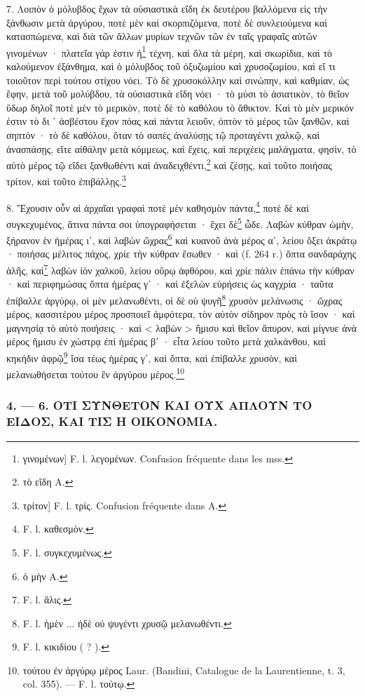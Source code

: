 \documentclass[a4paper, 11pt, oneside, polutonikogreek, french]{article}
\begin{document}
7. Λοιπὸν ὁ μόλυβδος ἔχων τὰ οὐσιαστικὰ εἴδη ἐκ δευτέρου βαλλόμενα εἰς τὴν ξάνθωσιν μετὰ ἀργύρου, ποτὲ μὲν καὶ σκορπιζόμενα, ποτὲ δὲ συνλειούμενα καὶ κατασπώμενα, καὶ διὰ τῶν ἄλλων μυρίων τεχνῶν τῶν ἐν ταῖς γραφαῖς αὐτῶν γινομένων · πλατεῖα γάρ ἐστιν ἡ\footnote{γινομένων] F. l. λεγομένων. Confusion fréquente dans les mss.} τέχνη, καὶ ὅλα τὰ μέρη, καὶ σκωρίδια, καὶ τὸ καλούμενον ἐξάνθημα, καὶ ὁ μόλυβδος τοῦ ὀξυζωμίου καὶ χρυσοζωμίου, καὶ εἴ τι τοιοῦτον περὶ τούτου στίχου νόει. Τὸ δὲ χρυσοκόλλην καὶ σινώπην, καὶ καθμίαν, ὡς ἔφην, μετὰ τοῦ μολύβδου, τὰ οὐσιαστικὰ εἴδη νόει · τὸ μύσι τὸ ἀσιατικὸν, τὸ θεῖον ὕδωρ δηλοῖ ποτὲ μὲν τὸ μερικὸν, ποτὲ δὲ τὸ καθόλου τὸ ἄθικτον. Καὶ τὸ μὲν μερικόν ἐστιν τὸ δι ᾽ ἀσβέστου ἔχον πόας καὶ πάντα λειοῦν, ὀπτὸν τὸ μέρος τῶν ξανθῶν, καὶ σηπτόν · τὸ δὲ καθόλου, ὅταν τὸ σαπὲς ἀναλύσῃς τῷ προταγέντι χαλκῷ, καὶ ἀνασπάσῃς, εἴτε αἰθάλην μετὰ κόμμεως, καὶ ἔχεις, καὶ περιχέεις μαλάγματα, φησὶν, τὸ αὐτὸ μέρος τῷ εἴδει ξανθωθέντι καὶ ἀναδειχθέντι,\footnote{τὸ εἴδη A.} καὶ ζέσῃς, καὶ τοῦτο ποιήσας τρίτον, καὶ τοῦτο ἐπιβάλλῃς.\footnote{τρίτον] F. l. τρὶς. Confusion fréquente dans A.}

8. Ἔχουσιν οὖν αἱ ἀρχαῖαι γραφαὶ ποτὲ μὲν καθησμὸν πάντα,\footnote{F. l. καθεσμὸν.} ποτὲ δὲ καὶ συγκεχυμένος, ἅτινα πάντα σοι ὑπογραφήσεται · ἔχει δὲ\footnote{F. l. συγκεχυμένως.} ὧδε. Λαβὼν κύθραν ὠμὴν, ξήρανον ἐν ἡμέρας ιʹ, καὶ λαβὼν ὤχρας\footnote{ὁ μὴν A.} καὶ κυανοῦ ἀνὰ μέρος αʹ, λείου ὄξει ἀκράτῳ · ποιήσας μέλιτος πάχος, χρίε τὴν κύθραν ἔσωθεν · καὶ (f. 264 r.) ὄπτα σανδαράχης ἀλῆς, καὶ\footnote{F. l. ἅλις.} λαβὼν ἰὸν χαλκοῦ, λείου οὔρῳ ἀφθόρου, καὶ χρίε πάλιν ἐπάνω τὴν κύθραν · καὶ περιφημώσας ὄπτα ἡμέρας γʹ · καὶ ἐξελὼν εὑρήσεις ὡς καγχρία · ταῦτα ἐπίβαλλε ἀργύρῳ, οἱ μὲν μελανωθέντι, οἱ δὲ οὐ ψυγῆ\footnote{F. l. ἠμὲν ... ἠδὲ οὐ ψυγέντι χρυσῷ μελανωθέντι.} χρυσὸν μελάνωσις · ὤχρας μέρος, κασσιτέρου μέρος προσποιεῖ ἀμφότερα, τὸν αὐτὸν σίδηρον πρὸς τὸ ἴσον · καὶ μαγνησίᾳ τὸ αὐτὸ ποιήσεις · καὶ < λαβὼν > ἥμισυ καὶ θεῖον ἄπυρον, καὶ μίγνυε ἀνὰ μέρος ἥμισυ ἐν χώστρᾳ ἐπὶ ἡμέρας βʹ · εἶτα λείου τοῦτο μετὰ χαλκάνθου, καὶ κηκήδιν ἀφρῷ\footnote{F. l. κικιδίου ( ? ).} ἴσα τέως ἡμέρας γʹ, καὶ ὄπτα, καὶ ἐπίβαλλε χρυσὸν, καὶ μελανωθήσεται τούτου ἓν ἀργύρου μέρος.\footnote{τούτου ἐν ἀργύρῳ μέρος Laur. (Bandini, Catalogue de la Laurentienne, t. 3, col. 355). --- F. l. τούτῳ.}

\bigskip
\centerline{\EightStarTaper}
\centerline{\EightStarTaper\EightStarTaper}
\bigskip

\subsubsection{4. --- 6. ΟΤΙ ΣΥΝΘΕΤΟΝ ΚΑΙ ΟΥΧ ΑΠΛΟΥΝ ΤΟ ΕΙΔΟΣ, ΚΑΙ ΤΙΣ Η ΟΙΚΟΝΟΜΙΑ.}
\end{document}
